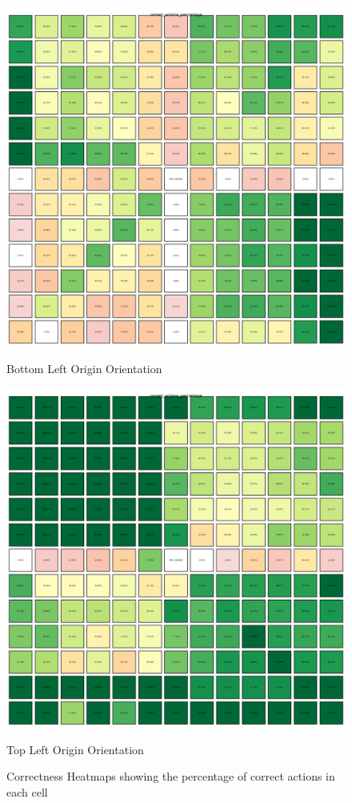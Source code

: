 \begin{figure}[h]
  \centering
  \begin{minipage}[b]{0.45\textwidth}
    \centering
    \includegraphics[width=\textwidth]{
      images/results_discussion/correctness_hm_BL.png
    }
    \caption{Bottom Left Origin Orientation}
    \label{fig:heatmapBL}
  \end{minipage}
  \hfill
  \begin{minipage}[b]{0.45\textwidth}
    \centering
    \includegraphics[width=\textwidth]{
      images/results_discussion/correctness_hm_TL.png
    }
    \caption{Top Left Origin Orientation}
    \label{fig:heatmapTL}
  \end{minipage}
  \caption{Correctness Heatmaps showing the percentage of correct actions in
  each cell}
  \label{fig:orientation_correctness}
\end{figure}
